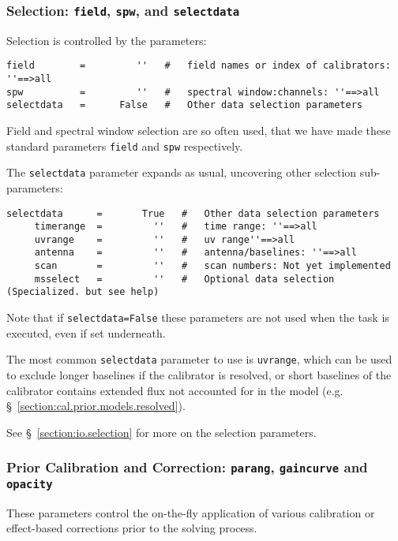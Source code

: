 \subsubsection{Selection: {\tt field}, {\tt spw},
and {\tt selectdata} }
\label{section:cal.solve.pars.select}

Selection is controlled by the parameters:
\small
\begin{verbatim}
field        =         ''   #   field names or index of calibrators: ''==>all
spw          =         ''   #   spectral window:channels: ''==>all 
selectdata   =      False   #   Other data selection parameters
\end{verbatim}
\normalsize

Field and spectral window selection are so often used, that we have
made these standard parameters {\tt field} and {\tt spw} respectively.

The {\tt selectdata} parameter expands as usual, uncovering other
selection sub-parameters:
\small
\begin{verbatim}
selectdata      =       True   #   Other data selection parameters
     timerange  =         ''   #   time range: ''==>all 
     uvrange    =         ''   #   uv range''==>all 
     antenna    =         ''   #   antenna/baselines: ''==>all 
     scan       =         ''   #   scan numbers: Not yet implemented
     msselect   =         ''   #   Optional data selection (Specialized. but see help)
\end{verbatim}
\normalsize
Note that if {\tt selectdata=False} these parameters are not used when
the task is executed, even if set underneath.

The most common {\tt selectdata} parameter to use is {\tt uvrange},
which can be used to exclude longer baselines if the calibrator is
resolved, or short baselines of the calibrator contains extended flux
not accounted for in the model 
(e.g. \S~\ref{section:cal.prior.models.resolved}).

See \S~\ref{section:io.selection} for more on the selection parameters.

\subsubsection{Prior Calibration and Correction: {\tt parang}, {\tt gaincurve} and
   {\tt opacity} }
\label{section:cal.solve.pars.prior}

These parameters control the on-the-fly application of various
calibration or effect-based corrections prior to the solving process.

